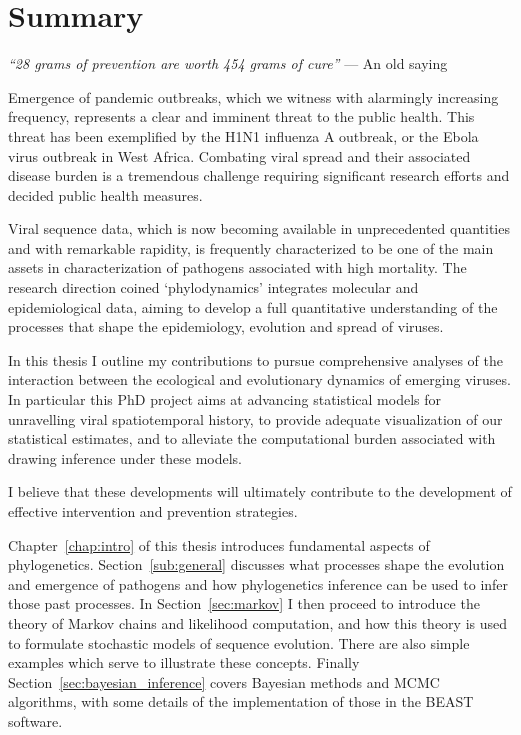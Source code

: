 
\chapter*{Summary}

\bigskip{}

\emph{``28 grams of prevention are worth 454 grams of cure''}
--- An old saying

\bigskip{}

Emergence of pandemic outbreaks, which we witness with alarmingly increasing frequency, represents a clear and imminent threat to the public health. 
This threat has been exemplified by the H1N1 influenza A outbreak, or the Ebola virus outbreak in West Africa.
Combating viral spread and their associated disease burden is a tremendous challenge requiring significant research efforts and decided public health measures. 

Viral sequence data, which is now becoming available in unprecedented quantities and with remarkable rapidity, is frequently characterized to be one of the main assets in characterization of pathogens associated with high mortality. 
The research direction coined `phylodynamics' integrates molecular and epidemiological data, aiming to develop a full quantitative understanding  of the processes that shape the epidemiology, evolution and spread of viruses.

In this thesis I outline my contributions to pursue comprehensive analyses of the interaction between the ecological and evolutionary dynamics of emerging viruses.
In particular this PhD project aims at advancing statistical models for unravelling viral spatiotemporal history, to provide adequate visualization of our statistical estimates, and to alleviate the computational burden associated with drawing inference under these models.

I believe that these developments will ultimately contribute to the development of effective intervention and prevention strategies. 

Chapter~\ref{chap:intro} of this thesis introduces fundamental aspects of phylogenetics.
Section~\ref{sub:general} discusses what processes shape the evolution and emergence of pathogens and how phylogenetics inference can be used to infer those past processes.
In Section~\ref{sec:markov} I then proceed to introduce the theory of Markov chains and likelihood computation, and how this theory is used to formulate stochastic models of sequence evolution. 
There are also simple examples which serve to illustrate these concepts.
Finally Section~\ref{sec:bayesian_inference} covers Bayesian methods and MCMC algorithms, with some details of the implementation of those in the BEAST software.

